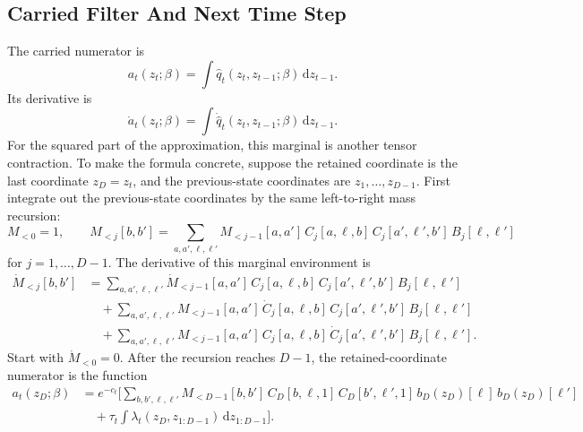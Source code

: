 \documentclass[11pt]{article}
\numberwithin{equation}{section}
\newcommand{\dd}{\,\mathrm d}
\begin{document}
\subsection{Carried Filter And Next Time Step}

The carried numerator is
\begin{equation}
    a_t(z_t;\beta)
    =
    \int \widehat q_t(z_t,z_{t-1};\beta)\dd z_{t-1}.
    \label{eq:p24-p19-73}
\end{equation}
Its derivative is
\begin{equation}
    \dot a_t(z_t;\beta)
    =
    \int \dot{\widehat q}_t(z_t,z_{t-1};\beta)\dd z_{t-1}.
    \label{eq:p24-p19-74}
\end{equation}
For the squared part of the approximation, this marginal is another tensor
contraction.  To make the formula concrete, suppose the retained coordinate is
the last coordinate \(z_D=z_t\), and the previous-state coordinates are
\(z_1,\ldots,z_{D-1}\).  First integrate out the previous-state coordinates by
the same left-to-right mass recursion:
\begin{equation}
    M_{<0}=1,
    \qquad
    M_{<j}[b,b']
    =
    \sum_{a,a',\ell,\ell'}
    M_{<j-1}[a,a']\,
    C_j[a,\ell,b]\,
    C_j[a',\ell',b']\,
    B_j[\ell,\ell']
    \label{eq:p24-p19-74a}
\end{equation}
for \(j=1,\ldots,D-1\).  The derivative of this marginal environment is
\begin{equation}
\begin{aligned}
    \dot M_{<j}[b,b']
    &=
    \sum_{a,a',\ell,\ell'}
    \dot M_{<j-1}[a,a']\,
    C_j[a,\ell,b]\,
    C_j[a',\ell',b']\,
    B_j[\ell,\ell']\\
    &\quad+
    \sum_{a,a',\ell,\ell'}
    M_{<j-1}[a,a']\,
    \dot C_j[a,\ell,b]\,
    C_j[a',\ell',b']\,
    B_j[\ell,\ell']\\
    &\quad+
    \sum_{a,a',\ell,\ell'}
    M_{<j-1}[a,a']\,
    C_j[a,\ell,b]\,
    \dot C_j[a',\ell',b']\,
    B_j[\ell,\ell'].
\end{aligned}
    \label{eq:p24-p19-74b}
\end{equation}
Start with \(\dot M_{<0}=0\).  After the recursion reaches \(D-1\), the
retained-coordinate numerator is the function
\begin{equation}
\begin{aligned}
    a_t(z_D;\beta)
    &=
    e^{-c_t}\Biggl[
    \sum_{b,b',\ell,\ell'}
    M_{<D-1}[b,b']\,
    C_D[b,\ell,1]\,
    C_D[b',\ell',1]\,
    b_D(z_D)[\ell]\,
    b_D(z_D)[\ell']\\
    &\quad+
    \tau_t
    \int \lambda_t(z_D,z_{1:D-1})\dd z_{1:D-1}
    \Biggr].
\end{aligned}
    \label{eq:p24-p19-74c}
\end{equation}
\end{document}
